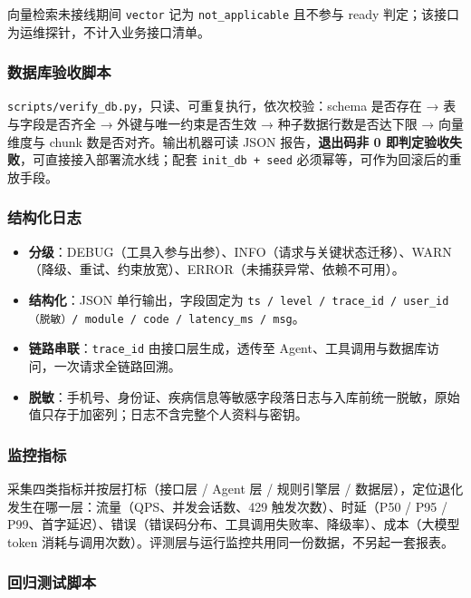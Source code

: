 \documentclass[12pt,a4paper]{ctexart}
\begin{document}
向量检索未接线期间 \texttt{vector} 记为 \texttt{not\_applicable} 且不参与 ready 判定；该接口为运维探针，不计入业务接口清单。

\subsubsection{数据库验收脚本}

\texttt{scripts/verify\_db.py}，只读、可重复执行，依次校验：schema 是否存在 → 表与字段是否齐全 → 外键与唯一约束是否生效 → 种子数据行数是否达下限 → 向量维度与 chunk 数是否对齐。输出机器可读 JSON 报告，\textbf{退出码非 0 即判定验收失败}，可直接接入部署流水线；配套 \texttt{init\_db + seed} 必须幂等，可作为回滚后的重放手段。

\subsubsection{结构化日志}

\begin{itemize}[leftmargin=1em]
\item \textbf{分级}：DEBUG（工具入参与出参）、INFO（请求与关键状态迁移）、WARN（降级、重试、约束放宽）、ERROR（未捕获异常、依赖不可用）。
\item \textbf{结构化}：JSON 单行输出，字段固定为 \texttt{ts / level / trace\_id / user\_id（脱敏）/ module / code / latency\_ms / msg}。
\item \textbf{链路串联}：\texttt{trace\_id} 由接口层生成，透传至 Agent、工具调用与数据库访问，一次请求全链路回溯。
\item \textbf{脱敏}：手机号、身份证、疾病信息等敏感字段落日志与入库前统一脱敏，原始值只存于加密列；日志不含完整个人资料与密钥。
\end{itemize}

\subsubsection{监控指标}

采集四类指标并按层打标（接口层 / Agent 层 / 规则引擎层 / 数据层），定位退化发生在哪一层：流量（QPS、并发会话数、429 触发次数）、时延（P50 / P95 / P99、首字延迟）、错误（错误码分布、工具调用失败率、降级率）、成本（大模型 token 消耗与调用次数）。评测层与运行监控共用同一份数据，不另起一套报表。

\subsubsection{回归测试脚本}
\end{document}
